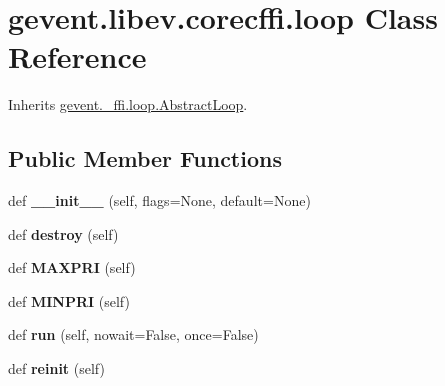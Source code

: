 \hypertarget{classgevent_1_1libev_1_1corecffi_1_1loop}{}\section{gevent.\+libev.\+corecffi.\+loop Class Reference}
\label{classgevent_1_1libev_1_1corecffi_1_1loop}


Inherits \hyperlink{classgevent_1_1__ffi_1_1loop_1_1_abstract_loop}{gevent.\+\_\+ffi.\+loop.\+Abstract\+Loop}.

\subsection*{Public Member Functions}
\begin{DoxyCompactItemize}
\item 
\mbox{\label{classgevent_1_1libev_1_1corecffi_1_1loop_a8c13a3affac49c7caf885d4efee3956a}} 
def {\bfseries \+\_\+\+\_\+init\+\_\+\+\_\+} (self, flags=None, default=None)
\item 
\mbox{\label{classgevent_1_1libev_1_1corecffi_1_1loop_a3723fa3a617cdf406f9804d30d4c45fd}} 
def {\bfseries destroy} (self)
\item 
\mbox{\label{classgevent_1_1libev_1_1corecffi_1_1loop_a92129bf0a9b381d9b1c418210c95daaf}} 
def {\bfseries M\+A\+X\+P\+RI} (self)
\item 
\mbox{\label{classgevent_1_1libev_1_1corecffi_1_1loop_a3aca5f7b897ad3f613fa4e43dd98bea3}} 
def {\bfseries M\+I\+N\+P\+RI} (self)
\item 
\mbox{\label{classgevent_1_1libev_1_1corecffi_1_1loop_a2c1d266539d1e1117377f456e2ef5ca1}} 
def {\bfseries run} (self, nowait=False, once=False)
\item 
\mbox{\label{classgevent_1_1libev_1_1corecffi_1_1loop_a416e92eb415d96197e41b7287b79d05e}} 
def {\bfseries reinit} (self)
\item 
\mbox{\label{classgevent_1_1libev_1_1corecffi_1_1loop_aefafe44ab10d264bece5dac4d59e01df}} 

\end{DoxyCompactItemize}
